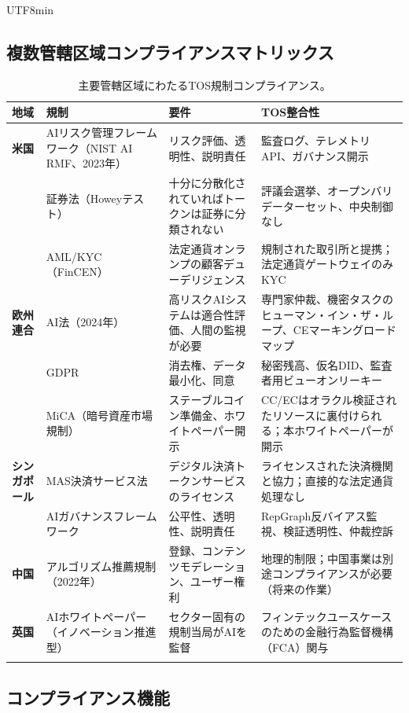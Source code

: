 \documentclass[11pt]{article}
\begin{document}
\begin{CJK}{UTF8}{min}
\begin{itemize}[noitemsep]
\subsection{複数管轄区域コンプライアンスマトリックス}

\begin{longtable}{@{}p{}p{}p{}p{}@{}}
\toprule
\textbf{地域} & \textbf{規制} & \textbf{要件} & \textbf{TOS整合性} \\\midrule
\textbf{米国} & AIリスク管理フレームワーク（NIST AI RMF、2023年） & リスク評価、透明性、説明責任 & 監査ログ、テレメトリAPI、ガバナンス開示 \\
 & 証券法（Howeyテスト） & 十分に分散化されていればトークンは証券に分類されない & 評議会選挙、オープンバリデーターセット、中央制御なし \\
 & AML/KYC（FinCEN） & 法定通貨オンランプの顧客デューデリジェンス & 規制された取引所と提携；法定通貨ゲートウェイのみKYC \\
\textbf{欧州連合} & AI法（2024年） & 高リスクAIシステムは適合性評価、人間の監視が必要 & 専門家仲裁、機密タスクのヒューマン・イン・ザ・ループ、CEマーキングロードマップ \\
 & GDPR & 消去権、データ最小化、同意 & 秘密残高、仮名DID、監査者用ビューオンリーキー \\
 & MiCA（暗号資産市場規制） & ステーブルコイン準備金、ホワイトペーパー開示 & CC/ECはオラクル検証されたリソースに裏付けられる；本ホワイトペーパーが開示 \\
\textbf{シンガポール} & MAS決済サービス法 & デジタル決済トークンサービスのライセンス & ライセンスされた決済機関と協力；直接的な法定通貨処理なし \\
 & AIガバナンスフレームワーク & 公平性、透明性、説明責任 & RepGraph反バイアス監視、検証透明性、仲裁控訴 \\
\textbf{中国} & アルゴリズム推薦規制（2022年） & 登録、コンテンツモデレーション、ユーザー権利 & 地理的制限；中国事業は別途コンプライアンスが必要（将来の作業） \\
\textbf{英国} & AIホワイトペーパー（イノベーション推進型） & セクター固有の規制当局がAIを監督 & フィンテックユースケースのための金融行為監督機構（FCA）関与 \\
\bottomrule
\caption{主要管轄区域にわたるTOS規制コンプライアンス。}
\end{longtable}

\subsection{コンプライアンス機能}


\end{itemize}
\end{CJK}
\end{document}
